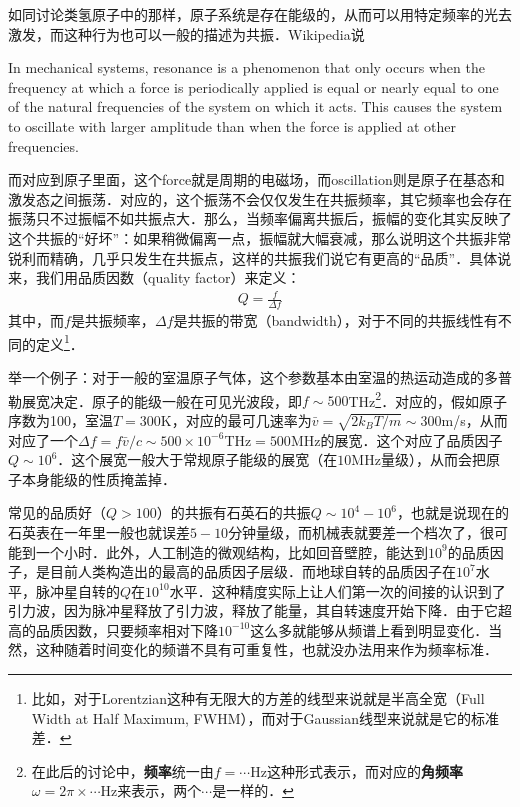 


如同讨论类氢原子中的那样，原子系统是存在能级的，从而可以用特定频率的光去激发，而这种行为也可以一般的描述为共振．Wikipedia说

In mechanical systems, resonance is a phenomenon that only occurs when the frequency at which a force is periodically applied is equal or nearly equal to one of the natural frequencies of the system on which it acts. This causes the system to oscillate with larger amplitude than when the force is applied at other frequencies.

而对应到原子里面，这个force就是周期的电磁场，而oscillation则是原子在基态和激发态之间振荡．对应的，这个振荡不会仅仅发生在共振频率，其它频率也会存在振荡只不过振幅不如共振点大．那么，当频率偏离共振后，振幅的变化其实反映了这个共振的“好坏”：如果稍微偏离一点，振幅就大幅衰减，那么说明这个共振非常锐利而精确，几乎只发生在共振点，这样的共振我们说它有更高的“品质”．具体说来，我们用品质因数（quality factor）来定义：
\begin{align}
Q = \frac{f}{\Delta f}
\end{align}
其中，而$f$是共振频率，$\Delta f$是共振的带宽（bandwidth），对于不同的共振线性有不同的定义\footnote{比如，对于Lorentzian这种有无限大的方差的线型来说就是半高全宽（Full Width at Half Maximum, FWHM），而对于Gaussian线型来说就是它的标准差．}．

举一个例子：对于一般的室温原子气体，这个参数基本由室温的热运动造成的多普勒展宽决定．原子的能级一般在可见光波段，即$f\sim 500$THz\footnote{在此后的讨论中，\textbf{频率}统一由$f=\cdots$Hz这种形式表示，而对应的\textbf{角频率}$\omega=2\pi\times\cdots$Hz来表示，两个$\cdots$是一样的．}．对应的，假如原子序数为100，室温$T=300$K，对应的最可几速率为$\bar{v}=\sqrt{2k_BT/m}\sim300$m/s，从而对应了一个$\Delta f=f\bar{v}/c\sim500\times10^{-6}$THz$=500$MHz的展宽．这个对应了品质因子$Q\sim10^6$．这个展宽一般大于常规原子能级的展宽（在$10$MHz量级），从而会把原子本身能级的性质掩盖掉．

常见的品质好（$Q>100$）的共振有石英石的共振$Q\sim10^4-10^6$，也就是说现在的石英表在一年里一般也就误差$5-10$分钟量级，而机械表就要差一个档次了，很可能到一个小时．此外，人工制造的微观结构，比如回音壁腔，能达到$10^9$的品质因子，是目前人类构造出的最高的品质因子层级．而地球自转的品质因子在$10^7$水平，脉冲星自转的$Q$在$10^{10}$水平．这种精度实际上让人们第一次的间接的认识到了引力波，因为脉冲星释放了引力波，释放了能量，其自转速度开始下降．由于它超高的品质因数，只要频率相对下降$10^{-10}$这么多就能够从频谱上看到明显变化．当然，这种随着时间变化的频谱不具有可重复性，也就没办法用来作为频率标准．

